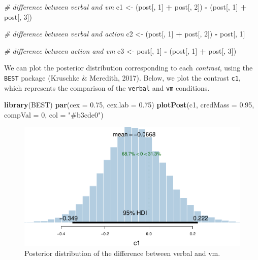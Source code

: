 \documentclass[floatsintext,doc]{apa6}
\newenvironment{Shaded}{\begin{snugshade}}{\end{snugshade}}
\newcommand{\CommentTok}[1]{\textcolor[rgb]{0.56,0.35,0.01}{\textit{#1}}}
\newcommand{\DataTypeTok}[1]{\textcolor[rgb]{0.13,0.29,0.53}{#1}}
\newcommand{\DecValTok}[1]{\textcolor[rgb]{0.00,0.00,0.81}{#1}}
\newcommand{\FloatTok}[1]{\textcolor[rgb]{0.00,0.00,0.81}{#1}}
\newcommand{\KeywordTok}[1]{\textcolor[rgb]{0.13,0.29,0.53}{\textbf{#1}}}
\newcommand{\NormalTok}[1]{#1}
\newcommand{\OperatorTok}[1]{\textcolor[rgb]{0.81,0.36,0.00}{\textbf{#1}}}
\newcommand{\StringTok}[1]{\textcolor[rgb]{0.31,0.60,0.02}{#1}}
\begin{document}
\begin{Shaded}
\begin{Highlighting}[]
\CommentTok{# difference between verbal and vm}
\NormalTok{c1 <-}\StringTok{ }\NormalTok{(post[, }\DecValTok{1}\NormalTok{] }\OperatorTok{+}\StringTok{ }\NormalTok{post[, }\DecValTok{2}\NormalTok{]) }\OperatorTok{-}\StringTok{ }\NormalTok{(post[, }\DecValTok{1}\NormalTok{] }\OperatorTok{+}\StringTok{ }\NormalTok{post[, }\DecValTok{3}\NormalTok{])}

\CommentTok{# difference between verbal and action}
\NormalTok{c2 <-}\StringTok{ }\NormalTok{(post[, }\DecValTok{1}\NormalTok{] }\OperatorTok{+}\StringTok{ }\NormalTok{post[, }\DecValTok{2}\NormalTok{]) }\OperatorTok{-}\StringTok{ }\NormalTok{post[, }\DecValTok{1}\NormalTok{]}

\CommentTok{# difference between action and vm}
\NormalTok{c3 <-}\StringTok{ }\NormalTok{post[, }\DecValTok{1}\NormalTok{] }\OperatorTok{-}\StringTok{ }\NormalTok{(post[, }\DecValTok{1}\NormalTok{] }\OperatorTok{+}\StringTok{ }\NormalTok{post[, }\DecValTok{3}\NormalTok{])}
\end{Highlighting}
\end{Shaded}

We can plot the posterior distribution corresponding to each \emph{contrast}, using the \texttt{BEST} package (Kruschke \& Meredith, 2017). Below, we plot the contrast \texttt{c1}, which represents the comparison of the \texttt{verbal} and \texttt{vm} conditions.

\begin{Shaded}
\begin{Highlighting}[]
\KeywordTok{library}\NormalTok{(BEST)}
\KeywordTok{par}\NormalTok{(}\DataTypeTok{cex =} \FloatTok{0.75}\NormalTok{, }\DataTypeTok{cex.lab =} \FloatTok{0.75}\NormalTok{)}
\KeywordTok{plotPost}\NormalTok{(c1, }\DataTypeTok{credMass =} \FloatTok{0.95}\NormalTok{, }\DataTypeTok{compVal =} \DecValTok{0}\NormalTok{, }\DataTypeTok{col =} \StringTok{"#b3cde0"}\NormalTok{)}
\end{Highlighting}
\end{Shaded}

\begin{figure}[H]

{\centering \includegraphics[width=0.75\linewidth]{supplementary_materials_files/figure-latex/unnamed-chunk-23-1} 

}

\caption{Posterior distribution of the difference between verbal and vm.}\label{fig:unnamed-chunk-23}
\end{figure}
\end{document}
